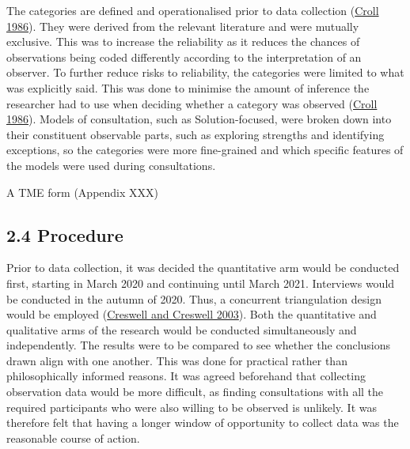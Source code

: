 \documentclass[
]{article}
\begin{document}
The categories are defined and operationalised prior to data collection
(\protect\hyperlink{ref-crollSystematicClassroomObservation1986}{Croll
1986}). They were derived from the relevant literature and were mutually
exclusive. This was to increase the reliability as it reduces the
chances of observations being coded differently according to the
interpretation of an observer. To further reduce risks to reliability,
the categories were limited to what was explicitly said. This was done
to minimise the amount of inference the researcher had to use when
deciding whether a category was observed
(\protect\hyperlink{ref-crollSystematicClassroomObservation1986}{Croll
1986}). Models of consultation, such as Solution-focused, were broken
down into their constituent observable parts, such as exploring
strengths and identifying exceptions, so the categories were more
fine-grained and which specific features of the models were used during
consultations.

A TME form (Appendix XXX)

\hypertarget{procedure}{%
\subsection{2.4 Procedure}\label{procedure}}

Prior to data collection, it was decided the quantitative arm would be
conducted first, starting in March 2020 and continuing until March 2021.
Interviews would be conducted in the autumn of 2020. Thus, a concurrent
triangulation design would be employed
(\protect\hyperlink{ref-creswellResearchDesignQualitative2003a}{Creswell
and Creswell 2003}). Both the quantitative and qualitative arms of the
research would be conducted simultaneously and independently. The
results were to be compared to see whether the conclusions drawn align
with one another. This was done for practical rather than
philosophically informed reasons. It was agreed beforehand that
collecting observation data would be more difficult, as finding
consultations with all the required participants who were also willing
to be observed is unlikely. It was therefore felt that having a longer
window of opportunity to collect data was the reasonable course of
action.
\end{document}

